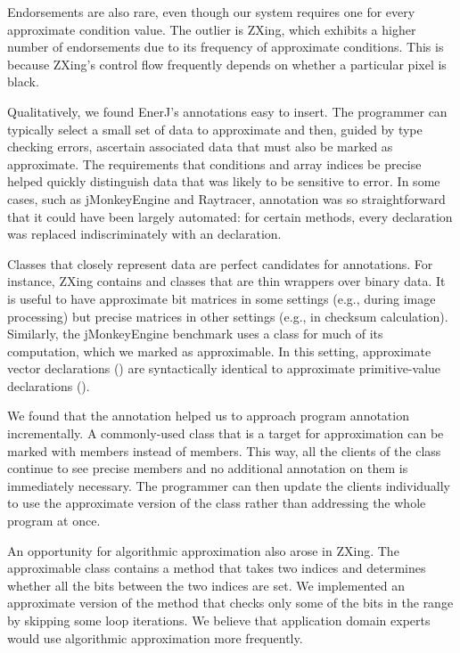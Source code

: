 Endorsements are also rare, even though our system requires one for every
approximate condition value. The outlier is ZXing, which exhibits a higher
number of endorsements due to its frequency of approximate conditions. This is
because ZXing's control flow
frequently depends on whether a particular pixel is black.

Qualitatively, we found EnerJ's annotations easy to insert. The programmer
can typically select a small set of data to approximate and then, guided by type
checking errors, ascertain associated data that must also be marked as
approximate. The requirements that conditions and array indices be precise
helped quickly distinguish data that was likely to be sensitive to error. In
some cases, such as jMonkeyEngine and Raytracer, annotation was so
straightforward that it could have been largely automated: for certain methods,
every  declaration was replaced indiscriminately with an
 declaration.

Classes that closely represent data are perfect candidates for
 annotations. For instance, ZXing contains
 and  classes that are thin wrappers over
binary data. It is useful to have approximate bit matrices in some settings (e.g.,
during image processing) but precise matrices in other settings (e.g., in
checksum calculation). Similarly, the jMonkeyEngine benchmark uses a
 class for much of its computation, which we marked
as approximable.
In this setting, approximate vector declarations
()
are syntactically identical to
approximate primitive-value declarations ().

We found that the  annotation helped us to approach program
annotation incrementally. A commonly-used class that is a target for
approximation can be marked with  members instead of
 members. This way, all the clients of the class continue to
see precise members and no additional annotation on them is immediately
necessary. The programmer can then update the clients individually to use the
approximate version of the class rather than addressing the whole program at
once.

An opportunity for algorithmic approximation also arose in ZXing. The
 approximable class contains a method  that
takes two indices and determines whether all the bits between the
two indices are set. We implemented an approximate version of the method that
checks only some of the bits in the range by skipping some loop iterations.
We believe that application domain experts would use algorithmic
approximation more frequently.


